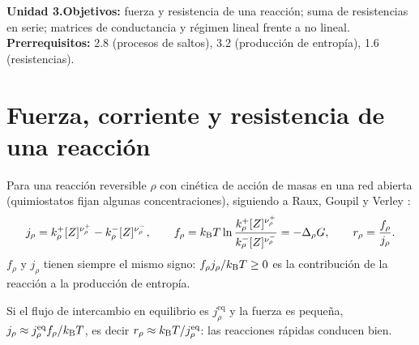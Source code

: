 \documentclass[11pt,a4paper]{article}
\begin{document}

\noindent\textbf{Unidad 3.}\quad\textbf{Objetivos:} fuerza y resistencia de una reacción; suma de resistencias en serie; matrices de
conductancia y régimen lineal frente a no lineal.
\textbf{Prerrequisitos:} 2.8 (procesos de saltos), 3.2 (producción de entropía), 1.6 (resistencias).

\section{Fuerza, corriente y resistencia de una reacción}
Para una reacción reversible $\rho$ con cinética de acción de masas en una red abierta (quimiostatos fijan algunas concentraciones),
siguiendo a Raux, Goupil y Verley \cite{raux}:
\begin{equation}
j_\rho=k_\rho^+[Z]^{\nu_\rho^+}-k_\rho^-[Z]^{\nu_\rho^-},\qquad
f_\rho=k_{\mathrm B} T\ln\frac{k_\rho^+[Z]^{\nu_\rho^+}}{k_\rho^-[Z]^{\nu_\rho^-}}=-\Delta_\rho G,\qquad r_\rho=\frac{f_\rho}{j_\rho}.
\end{equation}
$f_\rho$ y $j_\rho$ tienen siempre el mismo signo: $f_\rho j_\rho/k_{\mathrm B} T\ge0$ es la contribución de la reacción a la producción de entropía.
\begin{resultado}
Si el flujo de intercambio en equilibrio es $j^{\text{eq}}_\rho$ y la fuerza es pequeña, $j_\rho\approx j^{\text{eq}}_\rho f_\rho/k_{\mathrm B} T$, es decir
$r_\rho\approx k_{\mathrm B} T/j^{\text{eq}}_\rho$: las reacciones rápidas conducen bien.
\end{resultado}
\end{document}
